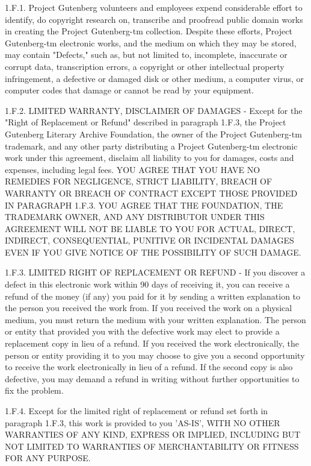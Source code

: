 \begin{PGtext}
1.F.1.  Project Gutenberg volunteers and employees expend considerable
effort to identify, do copyright research on, transcribe and proofread
public domain works in creating the Project Gutenberg-tm
collection.  Despite these efforts, Project Gutenberg-tm electronic
works, and the medium on which they may be stored, may contain
"Defects," such as, but not limited to, incomplete, inaccurate or
corrupt data, transcription errors, a copyright or other intellectual
property infringement, a defective or damaged disk or other medium, a
computer virus, or computer codes that damage or cannot be read by
your equipment.

1.F.2.  LIMITED WARRANTY, DISCLAIMER OF DAMAGES - Except for the "Right
of Replacement or Refund" described in paragraph 1.F.3, the Project
Gutenberg Literary Archive Foundation, the owner of the Project
Gutenberg-tm trademark, and any other party distributing a Project
Gutenberg-tm electronic work under this agreement, disclaim all
liability to you for damages, costs and expenses, including legal
fees.  YOU AGREE THAT YOU HAVE NO REMEDIES FOR NEGLIGENCE, STRICT
LIABILITY, BREACH OF WARRANTY OR BREACH OF CONTRACT EXCEPT THOSE
PROVIDED IN PARAGRAPH 1.F.3.  YOU AGREE THAT THE FOUNDATION, THE
TRADEMARK OWNER, AND ANY DISTRIBUTOR UNDER THIS AGREEMENT WILL NOT BE
LIABLE TO YOU FOR ACTUAL, DIRECT, INDIRECT, CONSEQUENTIAL, PUNITIVE OR
INCIDENTAL DAMAGES EVEN IF YOU GIVE NOTICE OF THE POSSIBILITY OF SUCH
DAMAGE.

1.F.3.  LIMITED RIGHT OF REPLACEMENT OR REFUND - If you discover a
defect in this electronic work within 90 days of receiving it, you can
receive a refund of the money (if any) you paid for it by sending a
written explanation to the person you received the work from.  If you
received the work on a physical medium, you must return the medium with
your written explanation.  The person or entity that provided you with
the defective work may elect to provide a replacement copy in lieu of a
refund.  If you received the work electronically, the person or entity
providing it to you may choose to give you a second opportunity to
receive the work electronically in lieu of a refund.  If the second copy
is also defective, you may demand a refund in writing without further
opportunities to fix the problem.

1.F.4.  Except for the limited right of replacement or refund set forth
in paragraph 1.F.3, this work is provided to you 'AS-IS', WITH NO OTHER
WARRANTIES OF ANY KIND, EXPRESS OR IMPLIED, INCLUDING BUT NOT LIMITED TO
WARRANTIES OF MERCHANTABILITY OR FITNESS FOR ANY PURPOSE.


\end{PGtext}
